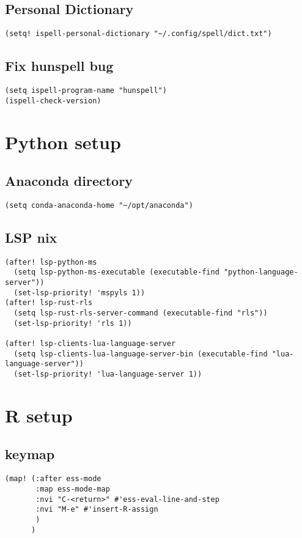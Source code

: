\documentclass[11pt]{article}
\begin{document}
\subsection*{Personal Dictionary}
\label{sec:org21f5499}
\begin{verbatim}
(setq! ispell-personal-dictionary "~/.config/spell/dict.txt")
\end{verbatim}
\subsection*{Fix hunspell bug}
\label{sec:org3c021ab}
\begin{verbatim}
(setq ispell-program-name "hunspell")
(ispell-check-version)
\end{verbatim}

\section*{Python setup}
\label{sec:org77ff75a}

\subsection*{Anaconda directory}
\label{sec:orgd9d07f8}
\begin{verbatim}
(setq conda-anaconda-home "~/opt/anaconda")
\end{verbatim}
\subsection*{LSP nix}
\label{sec:orgbd303dc}
\begin{verbatim}
(after! lsp-python-ms
  (setq lsp-python-ms-executable (executable-find "python-language-server"))
  (set-lsp-priority! 'mspyls 1))
(after! lsp-rust-rls
  (setq lsp-rust-rls-server-command (executable-find "rls"))
  (set-lsp-priority! 'rls 1))

(after! lsp-clients-lua-language-server
  (setq lsp-clients-lua-language-server-bin (executable-find "lua-language-server"))
  (set-lsp-priority! 'lua-language-server 1))
\end{verbatim}

\section*{R setup}
\label{sec:org6293492}
\subsection*{keymap}
\label{sec:org3f5e656}
\begin{verbatim}
(map! (:after ess-mode
       :map ess-mode-map
       :nvi "C-<return>" #'ess-eval-line-and-step
       :nvi "M-e" #'insert-R-assign
       )
      )
\end{verbatim}
\end{document}
